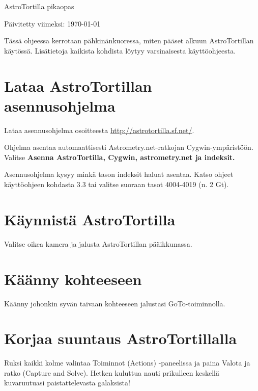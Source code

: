 \documentclass[finnish]{article}
\newcommand{\surl}[1]{{\small \url{#1}}}
\begin{document}
\centerline{\sf \Huge AstroTortilla pikaopas}
\centerline{Päivitetty viimeksi: \today}

Tässä ohjeessa kerrotaan pähkinänkuoressa, miten pääset alkuun AstroTortillan käytössä. Lisätietoja kaikista kohdista löytyy varsinaisesta käyttöohjeesta.

\section{Lataa AstroTortillan asennusohjelma}

Lataa asennusohjelma osoitteesta \surl{http://astrotortilla.sf.net/}. 

Ohjelma asentaa automaattisesti Astrometry.net-ratkojan Cygwin-ympäristöön. Valitse \textbf{Asenna AstroTortilla, Cygwin, astrometry.net ja indeksit.}

Asennusohjelma kysyy minkä tason indeksit haluat asentaa.
Katso ohjeet käyttöohjeen kohdasta 3.3 tai valitse suoraan tasot 4004-4019 (n. 2 Gt).

\section{Käynnistä AstroTortilla}

Valitse oikea kamera ja jalusta AstroTortillan pääikkunassa.

\section{Käänny kohteeseen}

Käänny johonkin syvän taivaan kohteeseen jalustasi GoTo-toiminnolla.

\section{Korjaa suuntaus AstroTortillalla}

Ruksi kaikki kolme valintaa Toiminnot (Actions) -paneelissa ja paina Valota ja ratko (Capture and Solve). Hetken kuluttua nauti prikulleen keskellä kuvaruutuasi paistattelevasta galaksista!
\end{document}
